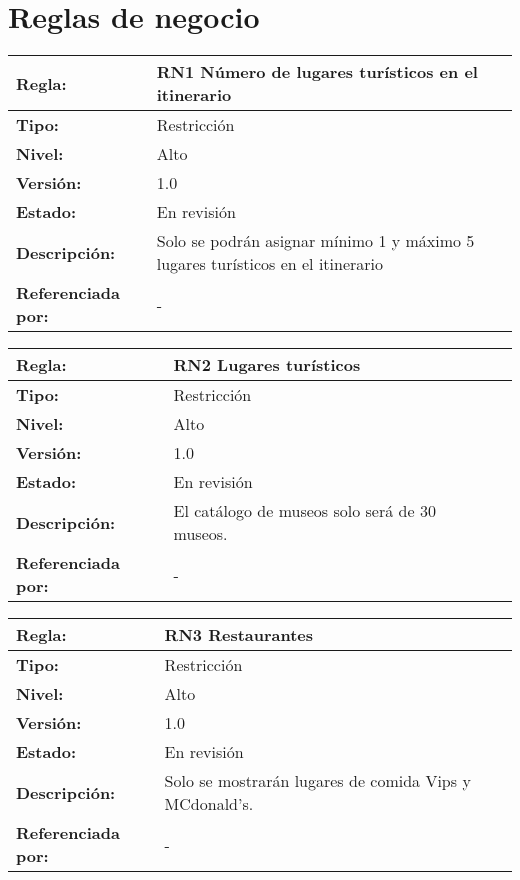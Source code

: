 \section{Reglas de negocio}

 \begin{table}[h]
    \begin{tabular}{|p{3.5cm}|p{10cm}|l|}
     \hline
     \textbf{Regla: } & RN1 N\'umero de lugares tur\'isticos en el itinerario\\ \hline
     \textbf{Tipo: } & Restricci\'on \\ \hline
     \textbf{Nivel:} & Alto \\ \hline
     \textbf{Versi\'on: } & 1.0 \\ \hline
     \textbf{Estado: } & En revisi\'on \\ \hline
     \textbf{Descripci\'on: } & Solo se podr\'an asignar m\'inimo 1 y m\'aximo 5 lugares tur\'isticos en el itinerario \\ \hline
     \textbf{Referenciada por: } & - \\
     \hline
   \end{tabular}
\end{table}

 \begin{table}[h]
    \begin{tabular}{|p{3.5cm}|p{10cm}|l|}
     \hline
     \textbf{Regla: } & RN2 Lugares tur\'isticos\\ \hline
     \textbf{Tipo: } & Restricci\'on \\ \hline
     \textbf{Nivel:} & Alto \\ \hline
     \textbf{Versi\'on: } & 1.0 \\ \hline
     \textbf{Estado: } & En revisi\'on \\ \hline
     \textbf{Descripci\'on: } & El cat\'alogo de museos solo ser\'a de 30 museos. \\ \hline
     \textbf{Referenciada por: } & - \\
     \hline
   \end{tabular}
\end{table}

 \begin{table}[h]
    \begin{tabular}{|p{3.5cm}|p{10cm}|l|}
     \hline
     \textbf{Regla: } & RN3 Restaurantes\\ \hline
     \textbf{Tipo: } & Restricci\'on \\ \hline
     \textbf{Nivel:} & Alto \\ \hline
     \textbf{Versi\'on: } & 1.0 \\ \hline
     \textbf{Estado: } & En revisi\'on \\ \hline
     \textbf{Descripci\'on: } & Solo se mostrar\'an lugares de comida Vips y MCdonald's. \\ \hline
     \textbf{Referenciada por: } & - \\
     \hline
   \end{tabular}
\end{table}

